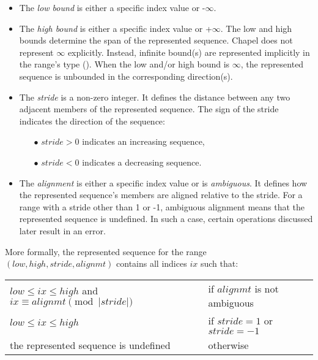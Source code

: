 \begin{itemize}

\item The \emph{low bound} is either a specific index value or -$\infty$.

\item The \emph{high bound} is either a specific index value or +$\infty$.
  The low and high bounds determine the span of the represented sequence.
%
  Chapel does not represent $\infty$ explicitly. Instead, infinite
  bound(s) are represented implicitly in the range's type
  ().
  When the low and/or high bound is $\infty$, the represented sequence
  is unbounded in the corresponding direction(s).

\item The \emph{stride} is a non-zero integer.
  It defines the distance between any two adjacent members of the
  represented sequence.
  The sign of the stride indicates the direction of the sequence:
  \begin{itemize}
  \item[$\bullet$] $stride > 0$ indicates an increasing sequence,
  \item[$\bullet$] $stride < 0$ indicates a decreasing sequence.
  \end{itemize}

\item The \emph{alignment} is either a specific index value or is \emph{ambiguous}.
  It defines how the represented sequence's members are aligned relative to the stride.
  For a range with a stride other than 1 or -1, 
  ambiguous alignment means that the represented sequence is undefined.
  In such a case, certain operations discussed later result in an error.

\end{itemize}

More formally, the represented sequence for the range
$(low, high, stride, alignmt)$
contains all indices $ix$ such that:

\begin{tabular}{ll}

$low \leq ix \leq high$ and $ix \equiv alignmt \pmod{|stride|}$ &
 if $alignmt$ is not ambiguous \\
$low \leq ix \leq high$ &
 if $stride = 1$ or $stride = -1$ \\
the represented sequence is undefined &
 otherwise

\end{tabular}


